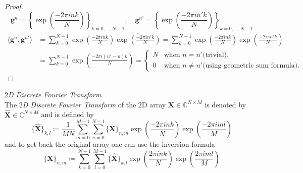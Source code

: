 \begin{proof}
    \begin{equation*}
        \boldsymbol{g}^n = \left\{\exp\left({\frac{-2\pi ink}{N}}\right)\right\}_{k=0,\ldots,N-1}, \quad \boldsymbol{g}^{n'} = \left\{\exp\left({\frac{-2\pi in'k}{N}}\right)\right\}_{k=0,\ldots,N-1}
    \end{equation*}
    \begin{equation*}
    \begin{split} 
        \langle\boldsymbol{g}^n,\boldsymbol{g}^{n'}\rangle &= \sum_{k=0}^{N-1} \exp\left({\frac{-2\pi ink}{N}}\right)\overline{\exp\left({\frac{-2\pi in'k}{N}}\right)}
        = \sum_{k=0}^{N-1} \exp\left({\frac{-2\pi ink}{N}}\right)\exp\left({\frac{+2\pi in'k}{N}}\right)\\
        &= \sum_{k=0}^{N-1} \exp\left({\frac{-2\pi i(n'-n)k}{N}}\right)=
        \begin{cases}
            N & \text{when $n = n'$}\text{(trivial)},\\
            0 & \text{when $n\neq n'$}\text{(using geometric sum formula)}.
        \end{cases}
    \end{split}
\end{equation*}
    
\end{proof}








\begin{Def}\label{def:2ddft}
    \emph{$2$D Discrete Fourier Transform}\\
    The \emph{$2$D Discrete Fourier Transform} of the $2$D array $\boldsymbol{X} \in \mathbb{C}^{N \times M}$ is denoted by 
    $\hat {\boldsymbol{X}} \in \mathbb{C}^{N \times M}$ and is defined by
    \begin{equation}\label{eq:2ddft}
        \{\hat {\boldsymbol{X}}\}_{k,l} \coloneq \frac{1}{MN}\sum_{m=0}^{M-1}\sum_{n=0}^{N-1} \{{\boldsymbol{X}}\}_{n,m}\exp\left({\frac{-2\pi ink}{N}}\right)\exp\left({\frac{-2\pi iml}{M}}\right)
    \end{equation}
    and to get back the original array one can use the inversion formula
    \begin{equation}\label{eq:2didft}
        \{{\boldsymbol{X}}\}_{n,m} \coloneq \sum_{k=0}^{N-1}\sum_{l=0}^{M-1}\{\hat {\boldsymbol{X}}\}_{k,l}\exp\left({\frac{2\pi ink}{N}}\right)\exp\left({\frac{2\pi iml}{M}}\right)
    \end{equation}    
\end{Def}

